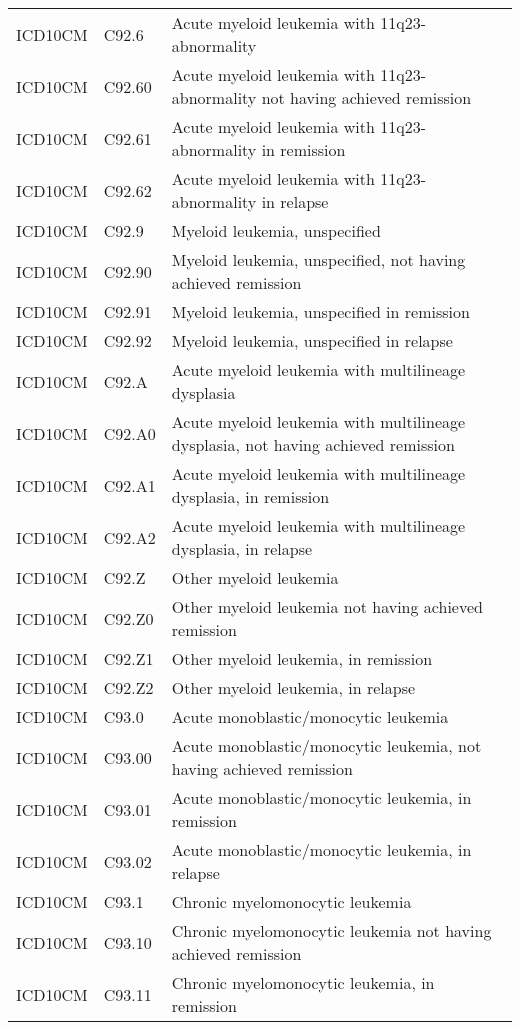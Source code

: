 \begin{table}[ht]
\begin{tabular}{lll}
  ICD10CM & C92.6 & Acute myeloid leukemia with 11q23-abnormality \\ 
  ICD10CM & C92.60 & Acute myeloid leukemia with 11q23-abnormality not having achieved remission \\ 
  ICD10CM & C92.61 & Acute myeloid leukemia with 11q23-abnormality in remission \\ 
  ICD10CM & C92.62 & Acute myeloid leukemia with 11q23-abnormality in relapse \\ 
  ICD10CM & C92.9 & Myeloid leukemia, unspecified \\ 
  ICD10CM & C92.90 & Myeloid leukemia, unspecified, not having achieved remission \\ 
  ICD10CM & C92.91 & Myeloid leukemia, unspecified in remission \\ 
  ICD10CM & C92.92 & Myeloid leukemia, unspecified in relapse \\ 
  ICD10CM & C92.A & Acute myeloid leukemia with multilineage dysplasia \\ 
  ICD10CM & C92.A0 & Acute myeloid leukemia with multilineage dysplasia, not having achieved remission \\ 
  ICD10CM & C92.A1 & Acute myeloid leukemia with multilineage dysplasia, in remission \\ 
  ICD10CM & C92.A2 & Acute myeloid leukemia with multilineage dysplasia, in relapse \\ 
  ICD10CM & C92.Z & Other myeloid leukemia \\ 
  ICD10CM & C92.Z0 & Other myeloid leukemia not having achieved remission \\ 
  ICD10CM & C92.Z1 & Other myeloid leukemia, in remission \\ 
  ICD10CM & C92.Z2 & Other myeloid leukemia, in relapse \\ 
  ICD10CM & C93.0 & Acute monoblastic/monocytic leukemia \\ 
  ICD10CM & C93.00 & Acute monoblastic/monocytic leukemia, not having achieved remission \\ 
  ICD10CM & C93.01 & Acute monoblastic/monocytic leukemia, in remission \\ 
  ICD10CM & C93.02 & Acute monoblastic/monocytic leukemia, in relapse \\ 
  ICD10CM & C93.1 & Chronic myelomonocytic leukemia \\ 
  ICD10CM & C93.10 & Chronic myelomonocytic leukemia not having achieved remission \\ 
  ICD10CM & C93.11 & Chronic myelomonocytic leukemia, in remission \\ 

\end{tabular}
\end{table}

